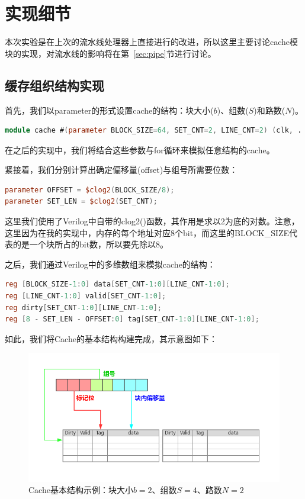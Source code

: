 \documentclass[12pt]{article} %
\begin{document}
\begin{sloppypar}
\newpage
\section{实现细节}

本次实验是在上次的流水线处理器上直接进行的改进，所以这里主要讨论cache模块的实现，对流水线的影响将在第~\ref{sec:pipe}节进行讨论。

\subsection{缓存组织结构实现}

首先，我们以parameter的形式设置cache的结构：块大小($b$)、组数($S$)和路数($N$)。
\begin{lstlisting}[language=Verilog]
module cache #(parameter BLOCK_SIZE=64, SET_CNT=2, LINE_CNT=2) (clk, ...);
\end{lstlisting} 
在之后的实现中，我们将结合这些参数与for循环来模拟任意结构的cache。

紧接着，我们分别计算出确定偏移量(offset)与组号所需要位数：
\begin{lstlisting}[language=Verilog]
parameter OFFSET = $clog2(BLOCK_SIZE/8);
parameter SET_LEN = $clog2(SET_CNT);
\end{lstlisting} 
这里我们使用了Verilog中自带的clog2()函数，其作用是求以2为底的对数。注意，这里因为在我的实现中，内存的每个地址对应8个bit，而这里的BLOCK\_SIZE代表的是一个块所占的bit数，所以要先除以8。

之后，我们通过Verilog中的多维数组来模拟cache的结构：
\begin{lstlisting}[language=Verilog]
reg [BLOCK_SIZE-1:0] data[SET_CNT-1:0][LINE_CNT-1:0];
reg [LINE_CNT-1:0] valid[SET_CNT-1:0];
reg dirty[SET_CNT-1:0][LINE_CNT-1:0];
reg [8 - SET_LEN - OFFSET:0] tag[SET_CNT-1:0][LINE_CNT-1:0];
\end{lstlisting} 

如此，我们将Cache的基本结构构建完成，其示意图如下：
\begin{figure}[h]
\centering
\includegraphics[width =\linewidth]{figure/ex.jpg}
\caption{Cache基本结构示例：块大小$b=2$、组数$S=4$、路数$N=2$}
\end{figure}


\end{sloppypar}
\end{document}
